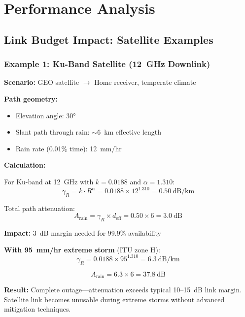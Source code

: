 \section{Performance Analysis}

\subsection{Link Budget Impact: Satellite Examples}

\subsubsection{Example 1: Ku-Band Satellite (12~GHz Downlink)}

\textbf{Scenario:} GEO satellite $\rightarrow$ Home receiver, temperate climate

\textbf{Path geometry:}
\begin{itemize}
\item Elevation angle: $30°$
\item Slant path through rain: $\sim$6~km effective length
\item Rain rate (0.01\% time): 12~mm/hr
\end{itemize}

\textbf{Calculation:}

For Ku-band at 12~GHz with $k = 0.0188$ and $\alpha = 1.310$:
\begin{equation}
\gamma_R = k \cdot R^\alpha = 0.0188 \times 12^{1.310} = 0.50~\text{dB/km}
\end{equation}

Total path attenuation:
\begin{equation}
A_{\text{rain}} = \gamma_R \times d_{\text{eff}} = 0.50 \times 6 = 3.0~\text{dB}
\end{equation}

\textbf{Impact:} 3~dB margin needed for 99.9\% availability

\textbf{With 95~mm/hr extreme storm} (ITU zone H):
\begin{equation}
\gamma_R = 0.0188 \times 95^{1.310} = 6.3~\text{dB/km}
\end{equation}

\begin{equation}
A_{\text{rain}} = 6.3 \times 6 = 37.8~\text{dB}
\end{equation}

\begin{warningbox}
\textbf{Result:} Complete outage---attenuation exceeds typical 10--15~dB link margin. Satellite link becomes unusable during extreme storms without advanced mitigation techniques.
\end{warningbox}

